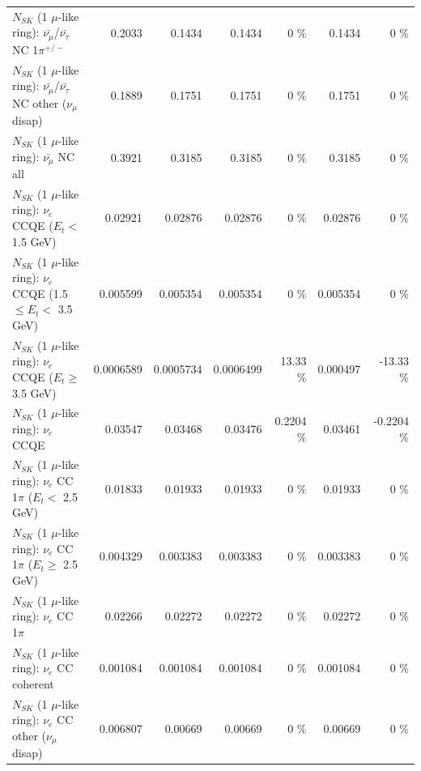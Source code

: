 \begin{table}
\begin{tabular}{| l | r | r | r  r | r  r |}
\hline
  $N_{SK}$ (1 $\mu$-like ring): $\bar{\nu_\mu}$/$\bar{\nu_\tau}$ NC 1$\pi^{+/-}$ &          0.2033 &          0.1434 &          0.1434 &        0 \%  &          0.1434 &        0 \%  \\ 
$N_{SK}$ (1 $\mu$-like ring): $\bar{\nu_\mu}$/$\bar{\nu_\tau}$ NC other ($\nu_\mu$ disap) &          0.1889 &          0.1751 &          0.1751 &        0 \%  &          0.1751 &        0 \%  \\ 
                          $N_{SK}$ (1 $\mu$-like ring): $\bar{\nu_{\mu}}$ NC all &          0.3921 &          0.3185 &          0.3185 &        0 \%  &          0.3185 &        0 \%  \\ 
\hline
\hline
\hline
                  $N_{SK}$ (1 $\mu$-like ring): $\nu_e$ CCQE ($E_{t} <$ 1.5 GeV) &         0.02921 &         0.02876 &         0.02876 &        0 \%  &         0.02876 &        0 \%  \\ 
         $N_{SK}$ (1 $\mu$-like ring): $\nu_e$ CCQE (1.5 $\leq E_{t} <$ 3.5 GeV) &        0.005599 &        0.005354 &        0.005354 &        0 \%  &        0.005354 &        0 \%  \\ 
               $N_{SK}$ (1 $\mu$-like ring): $\nu_e$ CCQE ($E_{t} \geq$ 3.5 GeV) &       0.0006589 &       0.0005734 &       0.0006499 &    13.33 \%  &        0.000497 &   -13.33 \%  \\ 
\hline
                                      $N_{SK}$ (1 $\mu$-like ring): $\nu_e$ CCQE &         0.03547 &         0.03468 &         0.03476 &   0.2204 \%  &         0.03461 &  -0.2204 \%  \\ 
\hline
             $N_{SK}$ (1 $\mu$-like ring): $\nu_e$ CC 1$\pi$ ($E_{t} <$ 2.5 GeV) &         0.01833 &         0.01933 &         0.01933 &        0 \%  &         0.01933 &        0 \%  \\ 
          $N_{SK}$ (1 $\mu$-like ring): $\nu_e$ CC 1$\pi$ ($E_{t} \geq$ 2.5 GeV) &        0.004329 &        0.003383 &        0.003383 &        0 \%  &        0.003383 &        0 \%  \\ 
\hline
                                 $N_{SK}$ (1 $\mu$-like ring): $\nu_e$ CC 1$\pi$ &         0.02266 &         0.02272 &         0.02272 &        0 \%  &         0.02272 &        0 \%  \\ 
                               $N_{SK}$ (1 $\mu$-like ring): $\nu_e$ CC coherent &        0.001084 &        0.001084 &        0.001084 &        0 \%  &        0.001084 &        0 \%  \\ 
                $N_{SK}$ (1 $\mu$-like ring): $\nu_e$ CC other ($\nu_\mu$ disap) &        0.006807 &         0.00669 &         0.00669 &        0 \%  &         0.00669 &        0 \%  \\ 

\end{tabular}
\end{table}
